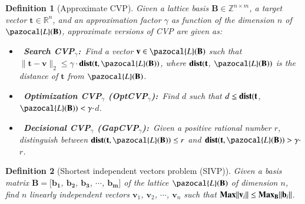 \documentclass[10pt]{elsarticle}
\newtheorem{definition}{Definition}
\begin{document}
\begin{definition}[Approximate CVP]
\normalfont Given a lattice basis $\mathbf{B}\in\mathbb{Z}^{n\times
m}$, a target vector $\mathbf{t}\in\mathbb{R}^{n}$, and an
approximation factor $\gamma$ as function of the dimension $n$ of
$\pazocal{L}(\mathbf{B})$, approximate versions of CVP are given as:

\begin{itemize}
\item~\textbf{Search CVP$_{\gamma}$:}~Find a vector $\mathbf{v}\in\pazocal{L}(\mathbf{B})$ such that $\parallel \mathbf{t} - \mathbf{v}\parallel_{2}\leq\gamma\cdot$$\mbox{\textbf{dist}}(\mathbf{t}, \pazocal{L}(\mathbf{B}))$, where $\mbox{\textbf{dist}}(\mathbf{t}$, $\pazocal{L}(\mathbf{B}))$ is the distance of $\mathbf{t}$ from $\pazocal{L}(\mathbf{B})$.

\item~\textbf{Optimization CVP$_{\gamma}$ (OptCVP$_{\gamma}$):}~Find $d$ such that $d\leq\mbox{\textbf{dist}}(\mathbf{t}$, $\pazocal{L}(\mathbf{B}))<\gamma\cdot$$d$.

\item~\textbf{Decisional CVP$_{\gamma}$ (GapCVP$_{\gamma}$):}~Given a positive rational number $r$, distinguish between $\mbox{\textbf{dist}}(\mathbf{t}, \pazocal{L}(\mathbf{B}))\leq r$ and $\mbox{\textbf{dist}}(\mathbf{t}, \pazocal{L}(\mathbf{B}))>\gamma\cdot$$r$.
\end{itemize}
\end{definition}

\begin{definition}[Shortest independent vectors problem (SIVP)]
 \normalfont Given a basis matrix $\mathbf{B}=[\mathbf{b_{1}}$,
 $\mathbf{b_{2}}$, $\mathbf{b_{3}}$, $\cdots$, $\mathbf{b_{m}}]$
 of the lattice $\pazocal{L}(\mathbf{B})$ of dimension $n$, find $n$
 linearly independent vectors $\mathbf{v}_{1}$, $\mathbf{v}_{2}$,
 $\cdots$, $\mathbf{v}_{n}$ such that $\mbox{\textbf{Max}}\|\mathbf{v}_{i}\|\leq\mbox{\textbf{Max}}_{\mathbf{B}}\|\mathbf{b}_{i}\|$.
\end{definition}
\end{document}
